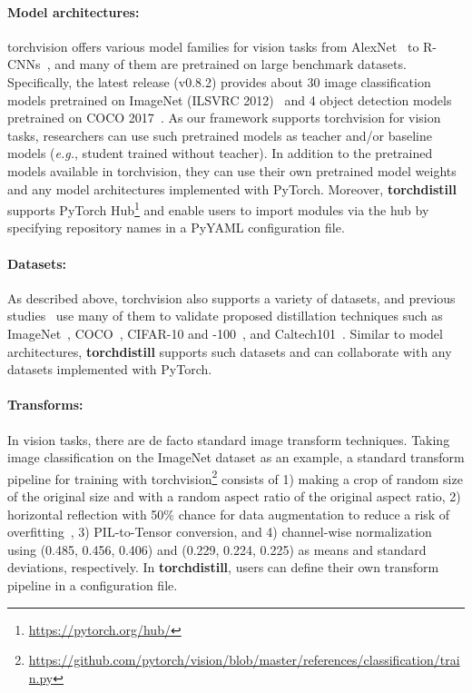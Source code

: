 \documentclass[runningheads]{llncs}
\newcommand{\FRAMEWORK}{{\bf torchdistill}\xspace}
\begin{document}
\paragraph{Model architectures:}
torchvision offers various model families for vision tasks from AlexNet~\cite{krizhevsky2012imagenet} to R-CNNs~\cite{ren2015faster,he2017mask}, and many of them are pretrained on large benchmark datasets.
Specifically, the latest release (v0.8.2) provides about 30 image classification models pretrained on ImageNet (ILSVRC 2012)~\cite{russakovsky2015imagenet} and 4 object detection models pretrained on COCO 2017~\cite{lin2014microsoft}.
As our framework supports torchvision for vision tasks, researchers can use such pretrained models as teacher and/or baseline models (\emph{e.g.}, student trained without teacher).
In addition to the pretrained models available in torchvision, they can use their own pretrained model weights and any model architectures implemented with PyTorch.
Moreover, \FRAMEWORK supports PyTorch Hub\footnote{\url{https://pytorch.org/hub/}} and enable users to import modules via the hub by specifying repository names in a PyYAML configuration file.

\paragraph{Datasets:}
As described above, torchvision also supports a variety of datasets, and previous studies~\cite{romero2015fitnets,yim2017gift,zagoruyko2017paying,passalis2018learning,kim2018paraphrasing,heo2019knowledge,park2019relational,wang2019distilling,ahn2019variational,matsubara2019distilled,peng2019correlation,tung2019similarity,tian2020contrastive} use many of them to validate proposed distillation techniques such as ImageNet~\cite{russakovsky2015imagenet}, COCO~\cite{lin2014microsoft}, CIFAR-10 and -100~\cite{krizhevsky2009learning}, and Caltech101~\cite{fei2006one}.
Similar to model architectures, \FRAMEWORK supports such datasets and can collaborate with any datasets implemented with PyTorch.

\paragraph{Transforms:}
In vision tasks, there are de facto standard image transform techniques.
Taking image classification on the ImageNet dataset as an example, a standard transform pipeline for training with torchvision\footnote{\label{fn:torchvision_train}\url{https://github.com/pytorch/vision/blob/master/references/classification/train.py}} consists of 1) making a crop of random size of the original size and  with a random aspect ratio of the original aspect ratio, 2) horizontal reflection with 50\% chance for data augmentation to reduce a risk of overfitting~\cite{krizhevsky2012imagenet}, 3) PIL-to-Tensor conversion, and 4) channel-wise normalization using (0.485, 0.456, 0.406) and (0.229, 0.224, 0.225) as means and standard deviations, respectively.
In \FRAMEWORK, users can define their own transform pipeline in a configuration file.
\end{document}
